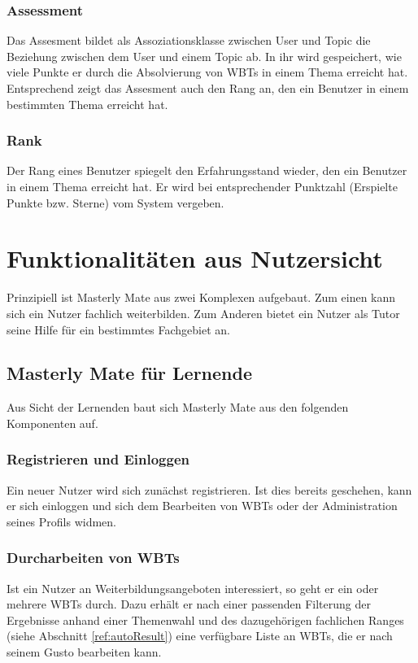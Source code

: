 \subsubsection{Assessment}
Das Assesment bildet als Assoziationsklasse zwischen User und Topic die
Beziehung zwischen dem User und einem Topic ab. In ihr wird gespeichert, wie
viele Punkte er durch die Absolvierung von WBTs in einem Thema erreicht hat.
Entsprechend zeigt das Assesment auch den Rang an, den ein Benutzer in einem
bestimmten Thema erreicht hat.

\subsubsection{Rank}
Der Rang eines Benutzer spiegelt den Erfahrungsstand wieder, den ein Benutzer in
einem Thema erreicht hat. Er wird bei entsprechender Punktzahl (Erspielte Punkte
bzw. Sterne) vom System vergeben.

\section{Funktionalitäten aus Nutzersicht}
Prinzipiell ist Masterly Mate aus zwei Komplexen aufgebaut. Zum einen kann sich
ein Nutzer fachlich weiterbilden. Zum Anderen bietet ein Nutzer als Tutor seine
Hilfe für ein bestimmtes Fachgebiet an.

\subsection{Masterly Mate für Lernende}
Aus Sicht der Lernenden baut sich Masterly Mate aus den folgenden Komponenten
auf.

\subsubsection{Registrieren und Einloggen}
Ein neuer Nutzer wird sich zunächst registrieren. Ist dies bereits geschehen,
kann er sich einloggen und sich dem Bearbeiten von WBTs oder der Administration
seines Profils widmen.

\subsubsection{Durcharbeiten von WBTs}
Ist ein Nutzer an Weiterbildungsangeboten interessiert, so geht er ein oder
mehrere WBTs durch. Dazu erhält er nach einer passenden Filterung der Ergebnisse
anhand einer Themenwahl und des dazugehörigen fachlichen Ranges (siehe Abschnitt
\ref{ref:autoResult}) eine verfügbare Liste an WBTs, die er nach seinem Gusto
bearbeiten kann.

